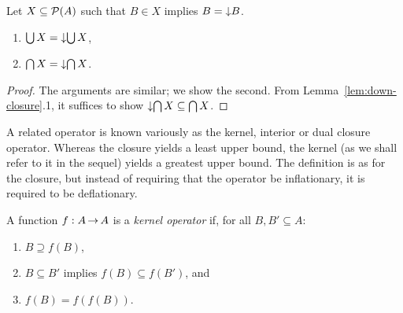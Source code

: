 \documentclass[11pt]{report}
\begin{document}
\begin{lemma}
  \label{lem:closure-lattice}
  Let $X \subseteq \mathcal{P}(A)$ such that $B \in X$ implies $B = \operatorname{\downarrow}\!B$.
  \begin{enumerate}
  \item $\bigcup X = \operatorname{\downarrow}\!\bigcup X$,
  \item $\bigcap X = \operatorname{\downarrow}\!\bigcap X$.
  \end{enumerate}
\end{lemma} 

\begin{proof}
  The arguments are similar; we show the second. From
  Lemma~\ref{lem:down-closure}.1, it suffices to show $\operatorname{\downarrow}\!\bigcap
  X \subseteq \bigcap X$.

  
  
\end{proof}

A related operator is known variously as the kernel, interior or dual closure operator. Whereas the closure yields a least upper bound, the kernel (as we shall refer to it in the sequel) yields a greatest upper bound. The definition is as for the closure, but instead of requiring that the operator be inflationary, it is required to be deflationary. 
\begin{definition} 
\label{def:kernel}
A function $f : A \operatorname{\rightarrow} A$ is a \emph{kernel
  operator} if, for all $B,B' \subseteq A$:
\begin{enumerate}
\item $B \supseteq f(B)$,
\item $B \subseteq B'$ implies $f(B) \subseteq f(B')$, and
\item $f(B) = f(f(B))$.
\end{enumerate}
\end{definition}
\end{document}
